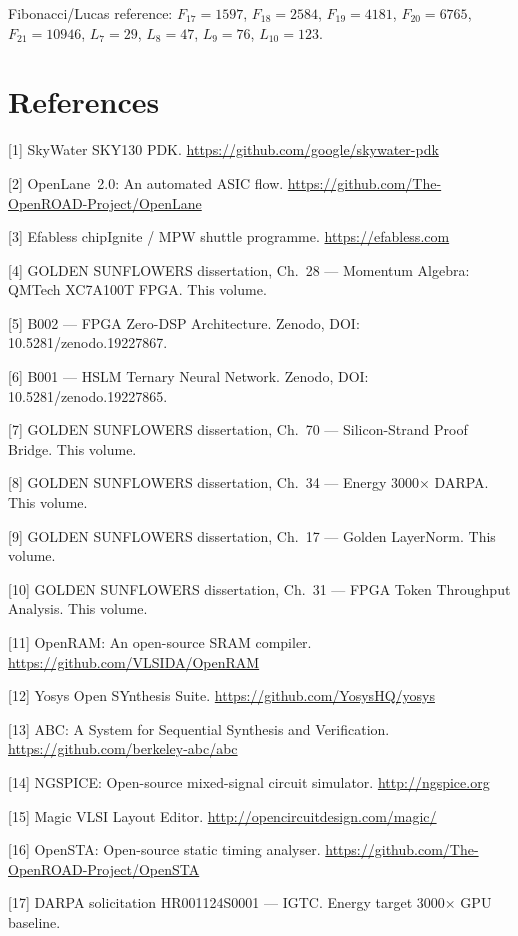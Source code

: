 Fibonacci/Lucas reference: \(F_{17}=1597\), \(F_{18}=2584\),
\(F_{19}=4181\), \(F_{20}=6765\), \(F_{21}=10946\), \(L_7=29\),
\(L_8=47\), \(L_9=76\), \(L_{10}=123\).

\section{References}\label{fa_72:references}

[1] SkyWater SKY130 PDK. \url{https://github.com/google/skywater-pdk}

[2] OpenLane~2.0: An automated ASIC flow.
\url{https://github.com/The-OpenROAD-Project/OpenLane}

[3] Efabless chipIgnite / MPW shuttle programme.
\url{https://efabless.com}

[4] GOLDEN SUNFLOWERS dissertation, Ch.~28 --- Momentum Algebra:
QMTech XC7A100T FPGA. This volume.

[5] B002 --- FPGA Zero-DSP Architecture. Zenodo, DOI:
10.5281/zenodo.19227867.

[6] B001 --- HSLM Ternary Neural Network. Zenodo, DOI:
10.5281/zenodo.19227865.

[7] GOLDEN SUNFLOWERS dissertation, Ch.~70 --- Silicon-Strand Proof
Bridge. This volume.

[8] GOLDEN SUNFLOWERS dissertation, Ch.~34 --- Energy 3000$\times$
DARPA. This volume.

[9] GOLDEN SUNFLOWERS dissertation, Ch.~17 --- Golden LayerNorm.
This volume.

[10] GOLDEN SUNFLOWERS dissertation, Ch.~31 --- FPGA Token Throughput
Analysis. This volume.

[11] OpenRAM: An open-source SRAM compiler.
\url{https://github.com/VLSIDA/OpenRAM}

[12] Yosys Open SYnthesis Suite.
\url{https://github.com/YosysHQ/yosys}

[13] ABC: A System for Sequential Synthesis and Verification.
\url{https://github.com/berkeley-abc/abc}

[14] NGSPICE: Open-source mixed-signal circuit simulator.
\url{http://ngspice.org}

[15] Magic VLSI Layout Editor.
\url{http://opencircuitdesign.com/magic/}

[16] OpenSTA: Open-source static timing analyser.
\url{https://github.com/The-OpenROAD-Project/OpenSTA}

[17] DARPA solicitation HR001124S0001 --- IGTC. Energy target
3000$\times$ GPU baseline.

